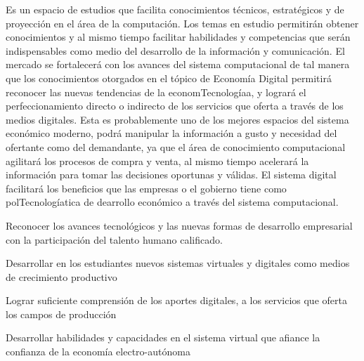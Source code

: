 \begin{syllabus}


\begin{justification}
Es un espacio de estudios que facilita conocimientos técnicos, estratégicos y de proyección en el área de la computación. Los temas en estudio permitirán obtener conocimientos y al mismo tiempo facilitar habilidades y competencias que serán indispensables como medio del desarrollo de la información y comunicación. El mercado se fortalecerá con los avances del sistema computacional de tal manera que los conocimientos otorgados en el tópico de Economía Digital permitirá reconocer las nuevas tendencias de la economTecnologíaa, y logrará el perfeccionamiento directo o indirecto de los servicios que oferta a través de los medios digitales. Esta es probablemente uno de los mejores espacios del sistema económico moderno, podrá manipular la información a gusto y necesidad del ofertante como del demandante, ya que el área de conocimiento computacional agilitará los procesos de compra y venta, al mismo tiempo acelerará la información para tomar las decisiones oportunas y válidas. El sistema digital facilitará los beneficios que las empresas o el gobierno tiene como polTecnologíatica de dearrollo económico a través del sistema computacional.
\end{justification}

\begin{goals}
\item Reconocer los avances tecnológicos y las nuevas formas de desarrollo empresarial con la participación del talento humano calificado.
\item Desarrollar en los estudiantes nuevos sistemas virtuales y digitales como medios de crecimiento productivo
\item Lograr suficiente comprensión de los aportes digitales, a los servicios que oferta los campos de producción
\item Desarrollar habilidades y capacidades en el sistema virtual que afiance la confianza de la economía electro-autónoma
\end{goals}

\begin{outcomes}
\end{outcomes}


\end{syllabus}
